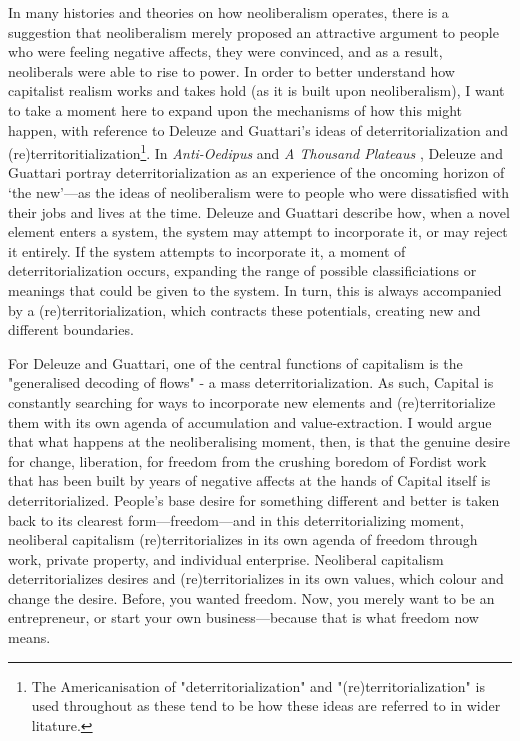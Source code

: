 In many histories and theories on how neoliberalism operates, there is a suggestion that neoliberalism merely proposed an attractive argument to people who were feeling negative affects, they were convinced, and as a result, neoliberals were able to rise to power. In order to better understand how capitalist realism works and takes hold (as it is built upon neoliberalism), I want to take a moment here to  expand upon the mechanisms of how this might happen,  with reference to Deleuze and Guattari's ideas of deterritorialization and (re)territoritialization\footnote{The Americanisation of "deterritorialization" and "(re)territorialization" is used throughout as these tend to be how these ideas are referred to in wider litature.}. In \textit{Anti-Oedipus} \citeyearpar{deleuze_anti-oedipus:_1983} and \emph{A Thousand Plateaus} \citeyearpar{deleuze_thousand_1987}, Deleuze and Guattari portray deterritorialization as an experience of the oncoming horizon of `the new'—as the ideas of neoliberalism were to people who were dissatisfied with their jobs and lives at the time. Deleuze and Guattari describe how, when a novel element enters a system, the system may attempt to incorporate it, or may reject it entirely. If the system attempts to incorporate it, a moment of deterritorialization occurs, expanding the range of possible classificiations or meanings that could be given to the system. In turn, this is always accompanied by a (re)territorialization, which contracts these potentials, creating new and different boundaries. 

For Deleuze and Guattari, one of the central functions of capitalism is the "generalised decoding of flows" \citep[p. 153]{deleuze_anti-oedipus:_1983} - a mass deterritorialization. As such, Capital is constantly searching for ways to incorporate new elements and (re)territorialize them with its own agenda of accumulation and value-extraction. I would argue that what happens at the neoliberalising moment, then, is that the genuine desire for change, liberation, for freedom from the crushing boredom of Fordist work that has been built by years of negative affects at the hands of Capital itself is deterritorialized. People's base desire for something different and better is taken back to its clearest form—freedom—and in this deterritorializing moment, neoliberal capitalism (re)territorializes in its own agenda of freedom through work, private property, and individual enterprise. Neoliberal capitalism deterritorializes desires and (re)territorializes in its own values, which colour and change the desire. Before, you wanted freedom. Now, you merely want to be an entrepreneur, or start your own business—because that is what freedom now means.


